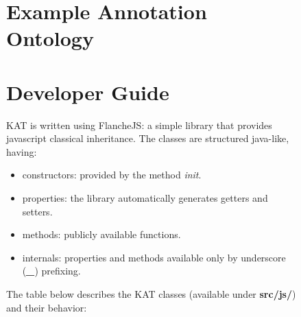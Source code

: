 \documentclass[a4paper, 12pt, notitlepage]{report}
\def\KAT{\textsf{KAT}\xspace}
\begin{document}
\begin{figure}[ht]
%
\section{Example Annotation Ontology}


\section{Developer Guide}
\KAT is written using FlancheJS: a simple library that provides javascript classical
inheritance. The classes are structured java-like, having:
\begin{itemize}
 \item constructors: provided by the method \textit{\textit{init}}.
 \item properties: the library automatically generates getters and setters.
 \item methods: publicly available functions.
 \item internals: properties and methods available only by underscore (\textbf{\textit{\_}}) prefixing.
\end{itemize}

The table below describes the \KAT classes (available under \textbf{src/js/}) and their behavior:


\end{figure}
\end{document}
